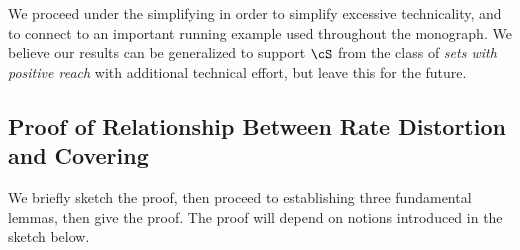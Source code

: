 \documentclass[../../book-main.tex]{subfiles}
\begin{document}
We proceed under the simplifying  in order to
simplify excessive technicality, and to connect to an important running example
used throughout the monograph. We believe our results can be generalized to
support $\cS$ from the class of \textit{sets with positive reach} with
additional technical effort, but leave this for the future.

\subsection{Proof of Relationship Between Rate Distortion and Covering}

We briefly sketch the proof, then proceed to establishing three fundamental
lemmas, then give the proof. The proof will depend on notions introduced in the
sketch below.
\end{document}
